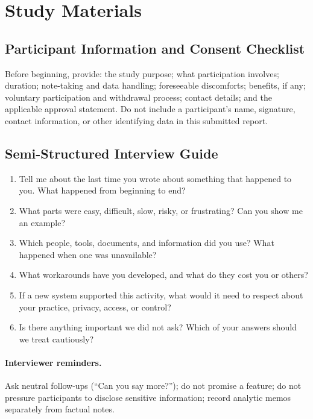 \documentclass[sigconf,nonacm]{acmart}
\begin{document}
\appendix

\section{Study Materials}
\label{app:materials}

\subsection{Participant Information and Consent Checklist}

Before beginning, provide: the study purpose; what participation involves;
duration; note-taking and data handling; foreseeable discomforts; benefits, if
any; voluntary participation and withdrawal process; contact details; and the
applicable approval statement. Do not include a participant's name, signature,
contact information, or other identifying data in this submitted report.

\subsection{Semi-Structured Interview Guide}

\begin{enumerate}
  \item Tell me about the last time you wrote about something that happened
  to you. What happened from beginning to end?
  \item What parts were easy, difficult, slow, risky, or frustrating? Can you
  show me an example?
  \item Which people, tools, documents, and information did you use? What
  happened when one was unavailable?
  \item What workarounds have you developed, and what do they cost you or
  others?
  \item If a new system supported this activity, what would it need to respect
  about your practice, privacy, access, or control?
  \item Is there anything important we did not ask? Which of your answers should
  we treat cautiously?
\end{enumerate}

\paragraph{Interviewer reminders.} Ask neutral follow-ups (``Can you say
more?''); do not promise a feature; do not pressure participants to disclose
sensitive information; record analytic memos separately from factual notes.
\end{document}
